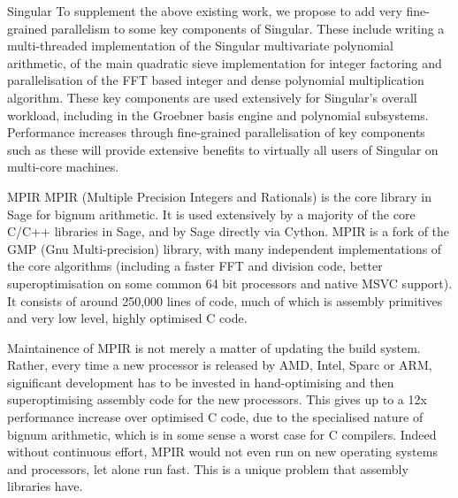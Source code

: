 \begin{Workpackage}{\thewpno}
\begin{task}{Singular}
To supplement the above existing work, we propose to add very fine-grained parallelism to some key components of Singular. These include writing a multi-threaded implementation of the Singular multivariate polynomial arithmetic, of the main quadratic sieve implementation for integer factoring and parallelisation of the FFT based integer and dense polynomial multiplication algorithm. These key components are used extensively for Singular's overall workload, including in the Groebner basis engine and polynomial subsystems. Performance increases through fine-grained parallelisation of key components such as these will provide extensive benefits to virtually all users of Singular on multi-core machines.
  
\begin{WPDeliverables}
\end{WPDeliverables}
\end{task}

\begin{task}{MPIR}
  \label{task:hpc_singular}
MPIR (Multiple Precision Integers and Rationals) is the core library in Sage
for bignum arithmetic. It is used extensively by a majority of the core C/C++
libraries in Sage, and by Sage directly via Cython. MPIR is a fork of the 
GMP (Gnu Multi-precision) library, with many independent implementations of the
core algorithms (including a faster FFT and division code, better 
superoptimisation on some common 64 bit processors and native MSVC support). 
It consists of around 250,000 lines of code, much of which is assembly 
primitives and very low level, highly optimised C code.

Maintainence of MPIR is not merely a matter of updating the build system.
Rather, every time a new processor is released by AMD, Intel, Sparc or ARM,
significant development has to be invested in hand-optimising and then
superoptimising assembly code for the new processors. This gives up to a 12x
performance increase over optimised C code, due to the specialised nature of
bignum arithmetic, which is in some sense a worst case for C compilers. Indeed
without continuous effort, MPIR would not even run on new operating systems and
processors, let alone run fast. This is a unique problem that assembly libraries
have.


\end{task}
\end{Workpackage}
